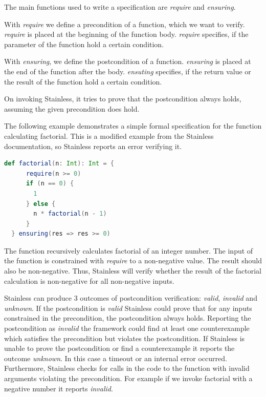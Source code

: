 The main functions used to write a specification are \textit{require} and \textit{ensuring}.

With \textit{require} we define a precondition of a function, which we want to verify.
\textit{require} is placed at the beginning of the function body.
\textit{require} specifies, if the parameter of the function hold a certain condition.

With \textit{ensuring}, we define the postcondition of a function.
\textit{ensuring} is placed at the end of the function after the body.
\textit{ensuting} specifies, if the return value or the result of the function hold a certain condition.

On invoking Stainless, it tries to prove that the postcondition always holds, assuming the given precondition does hold. \cite{Stainless:introduction}

The following example demonstrates a simple formal specification for the function calculating factorial.
This is a modified example from the Stainless documentation, so Stainless reports an error verifying it.
\begin{lstlisting}[language=Scala]
  def factorial(n: Int): Int = {
      require(n >= 0)
      if (n == 0) {
        1
      } else {
        n * factorial(n - 1)
      }
  } ensuring(res => res >= 0)
\end{lstlisting}

The function recursively calculates factorial of an integer number.
The input of the function is constrained with \textit{require} to a non-negative value.
The result should also be non-negative.
Thus, Stainless will verify whether the result of the factorial calculation is non-negative for all non-negative inputs.

Stainless can produce 3 outcomes of postcondition verification: \textit{valid}, \textit{invalid} and \textit{unknown}.
If the postcondition is \textit{valid} Stainless could prove that for any inputs constrained in the precondition, the postcondition always holds.
Reporting the postcondition as \textit{invalid} the framework could find at least one counterexample which satisfies the precondition but violates the postcondition.
If Stainless is unable to prove the postcondition or find a counterexample it reports the outcome \textit{unknown}.
In this case a timeout or an internal error occurred.
Furthermore, Stainless checks for calls in the code to the function with invalid arguments violating the precondition.
For example if we invoke factorial with a negative number it reports \textit{invalid}. \cite{Stainless:introduction}

